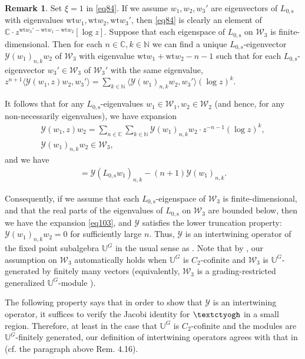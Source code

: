 \documentclass[12pt,a4paper,notitlepage]{article}
\theoremstyle{definition}
\newtheorem{rem}[df]{Remark}
\theoremstyle{plain}
\newcommand{\mc}{\mathcal}
\newcommand{\bk}[1]{\langle {#1}\rangle}
\newcommand{\Ubb}{\mathbb U}
\newcommand{\Cbb}{\mathbb C}
\newcommand{\Nbb}{\mathbb N}
\newcommand{\wt}{\mathrm{wt}}
\newcommand{\Lss}{{L_{0,\mathrm{s}}}}
\newcommand{\tipaz}{\text{\textctyogh}}
\numberwithin{equation}{subsection}
\begin{document}
\begin{rem}
Set $\xi=1$ in \eqref{eq84}. If we assume $w_1,w_2,w_3'$ are eigenvectors of $\Lss$ with eigenvalues $\wt w_1,\wt w_2,\wt w_3'$, then \eqref{eq84} is clearly an element of $\Cbb\cdot z^{\wt w_3'-\wt w_1-\wt w_2}[\log z]$. Suppose that each eigenspace of $\Lss$ on $\mc W_3$ is finite-dimensional. Then for each $n\in\Cbb, k\in\Nbb$ we can find a unique $\Lss$-eigenvector $\mc Y(w_1)_{n,k}w_2$ of $\mc W_3$ with eigenvalue $\wt w_1+\wt w_2-n-1$ such that for each $\Lss$-eigenvector $w_3'\in\mc W_3$ of $\mc W_3'$ with the same eigenvalue, $z^{n+1}\bk{\mc Y(w_1,z)w_2,w_3'}=\sum_{k\in\Nbb}\bk{\mc Y(w_1)_{n,k}w_2,w_3'}(\log z)^k$. 

It follows that for any $\Lss$-eigenvalues $w_1\in\mc W_1,w_2\in\mc W_2$ (and hence, for any non-necessarily eigenvalues), we have expansion
\begin{gather}
	\mc Y(w_1,z)w_2=\sum_{n\in\Cbb}\sum_{k\in\Nbb}\mc Y(w_1)_{n,k}w_2\cdot z^{-n-1}(\log z)^k,\nonumber\\	
\mc Y(w_1)_{n,k}w_2\in\mc W_3,	\label{eq103}
\end{gather}
and we have
\begin{align}
[\Lss,\mc Y(w_1)_{n,k}]=\mc Y(\Lss w_1)_{n,k}-(n+1)\mc Y(w_1)_{n,k}.	
\end{align}

Consequently,  if we assume that each $\Lss$-eigenspace of $\mc W_3$ is finite-dimensional, and that the real parts of the eigenvalues of $\Lss$ on $\mc W_3$ are bounded below, then we have the expansion \eqref{eq103}, and $\mc Y$ satisfies the lower truncation property: $\mc Y(w_1)_{n,k}w_2=0$ for sufficiently large $n$. Thus, $\mc Y$ is an intertwining operator of the fixed point subalgebra $\Ubb^G$ in the usual sense as \cite{HLZ10}. Note that by \cite[Lemma 2.4]{Miy04}, our assumption on $\mc W_3$ automatically holds when $\Ubb^G$ is $C_2$-cofinite and $\mc W_3$ is $\Ubb^G$-generated by finitely many vectors (equivalently, $\mc W_3$ is a grading-restricted generalized $\Ubb^G$-module \cite[Cor. 3.16]{Hua09}).
\end{rem}






The following property says that in order to show that $\mc Y$ is an intertwining operator, it suffices to verify the Jacobi identity for  $\tipaz$ in a small region. Therefore, at least in the case that $\Ubb^G$ is $C_2$-cofinite and the modules are $\Ubb^G$-finitely generated, our definition of intertwining operators agrees with that in \cite{McR21} (cf. the paragraph above Rem. 4.16).
\end{document}

